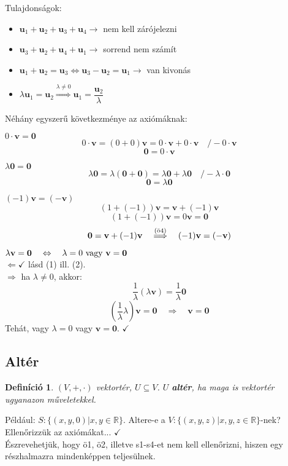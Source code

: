 \documentclass[a4paper,12pt,twoside]{book}
\newcommand{\vek}[1]{\mathbf{#1}} %
\newcommand{\R}{\mathbb{R}}
\newtheorem{defi}{Definíció}[chapter]
\theoremstyle{break}
\newenvironment{myitemize}
{\begin{itemize}
  \setlength{\itemsep}{1pt}
  \setlength{\parskip}{0pt}
  \setlength{\parsep}{0pt}}
{\end{itemize}}
\begin{document}
Tulajdonságok:
\begin{myitemize}
\renewcommand{\labelitemi}{$\circ$}
\item $\vek{u}_1+\vek{u}_2+\vek{u}_3+\vek{u}_4 \rightarrow$ nem kell zárójelezni
\item $\vek{u}_3+\vek{u}_2+\vek{u}_4+\vek{u}_1 \rightarrow$ sorrend nem számít
\item $\vek{u}_1+\vek{u}_2=\vek{u}_3 \Leftrightarrow \vek{u}_3-\vek{u}_2=\vek{u}_1 \rightarrow$ van kivonás
\item $\lambda\vek{u}_1=\vek{u}_2 \overset{\lambda\neq 0}{\Longrightarrow} \vek{u}_1 = \dfrac{\vek{u}_2}{\lambda}$
\end{myitemize}

Néhány egyszerű következménye az axiómáknak:
\begin{enumerate*}
\item $0\cdot \vek{v}=\vek{0}$\\
\[0\cdot \vek{v}=(0+0)\vek{v}=0\cdot \vek{v}+0\cdot \vek{v} \quad /-0\cdot \vek{v}\]
\[\vek{0}=0\cdot \vek{v}\]
\item $\lambda\vek{0} = \vek{0}$
\[\lambda\vek{0} = \lambda(\vek{0}+\vek{0})=\lambda\vek{0}+\lambda\vek{0} \quad /-\lambda\cdot \vek{0}\]
\[\vek{0} = \lambda\vek{0}\]
\item $(-1)\vek{v}=(-\vek{v})$
\[(1+(-1))\vek{v}=\vek{v}+(-1)\vek{v}\]
\[(1+(-1))\vek{v}=0\vek{v}=\vek{0}\]
\[\vek{0} = \vek{v}+(-1)\vek{v} \quad\overset{\hbox{\scriptsize (ö4)}}{\Longrightarrow}\quad (-1)\vek{v} = (-\vek{v}) \]
\item $\lambda\vek{v} = \vek{0} \quad \Leftrightarrow \quad \lambda = 0 \hbox{ vagy } \vek{v} = \vek{0}$\\
$\Leftarrow \checkmark$ lásd (1) ill. (2).\\
$\Rightarrow$ ha $\lambda\neq 0$, akkor:
\[\dfrac{1}{\lambda}(\lambda\vek{v}) = \dfrac{1}{\lambda}\vek{0}\]
\[\left(\dfrac{1}{\lambda}\lambda\right)\vek{v} = \vek{0} \quad\Rightarrow\quad \vek{v} = \vek{0}\]
Tehát, vagy $\lambda=0$ vagy $\vek{v}=\vek{0}$. $\checkmark$
\end{enumerate*}

\subsection{Altér}

\begin{defi} $(V,+,\cdot)$ vektortér, $U\subseteq V$. $U$ \textbf{altér}, ha maga is vektortér ugyanazon műveletek\-kel.\end{defi}
Például: $S:\{(x,y,0)|x,y\in\R\}$. Altere-e a $V:\{(x,y,z)|x,y,z\in\R\}$-nek?\\
Ellenőrizzük az axiómákat... $\checkmark$\\
Észrevehetjük, hogy ö1, ö2, illetve s1-s4-et nem kell ellenőrizni, hiszen egy részhalmazra mindenképpen teljesülnek.
\end{document}
